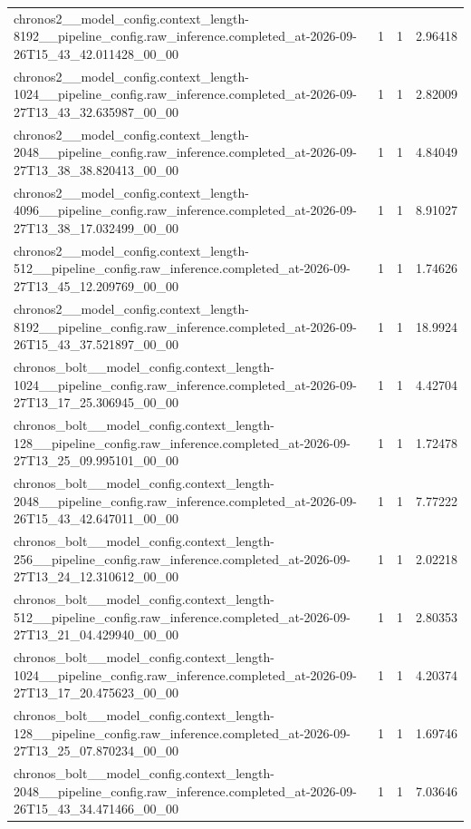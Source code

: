 \begin{tabular}{llll}
chronos2\_\_model\_config.context\_length-8192\_\_pipeline\_config.raw\_inference.completed\_at-2026-09-26T15\_43\_42.011428\_00\_00 & 1 & 1 & 2.96418 \\
chronos2\_\_model\_config.context\_length-1024\_\_pipeline\_config.raw\_inference.completed\_at-2026-09-27T13\_43\_32.635987\_00\_00 & 1 & 1 & 2.82009 \\
chronos2\_\_model\_config.context\_length-2048\_\_pipeline\_config.raw\_inference.completed\_at-2026-09-27T13\_38\_38.820413\_00\_00 & 1 & 1 & 4.84049 \\
chronos2\_\_model\_config.context\_length-4096\_\_pipeline\_config.raw\_inference.completed\_at-2026-09-27T13\_38\_17.032499\_00\_00 & 1 & 1 & 8.91027 \\
chronos2\_\_model\_config.context\_length-512\_\_pipeline\_config.raw\_inference.completed\_at-2026-09-27T13\_45\_12.209769\_00\_00 & 1 & 1 & 1.74626 \\
chronos2\_\_model\_config.context\_length-8192\_\_pipeline\_config.raw\_inference.completed\_at-2026-09-26T15\_43\_37.521897\_00\_00 & 1 & 1 & 18.9924 \\
chronos\_bolt\_\_model\_config.context\_length-1024\_\_pipeline\_config.raw\_inference.completed\_at-2026-09-27T13\_17\_25.306945\_00\_00 & 1 & 1 & 4.42704 \\
chronos\_bolt\_\_model\_config.context\_length-128\_\_pipeline\_config.raw\_inference.completed\_at-2026-09-27T13\_25\_09.995101\_00\_00 & 1 & 1 & 1.72478 \\
chronos\_bolt\_\_model\_config.context\_length-2048\_\_pipeline\_config.raw\_inference.completed\_at-2026-09-26T15\_43\_42.647011\_00\_00 & 1 & 1 & 7.77222 \\
chronos\_bolt\_\_model\_config.context\_length-256\_\_pipeline\_config.raw\_inference.completed\_at-2026-09-27T13\_24\_12.310612\_00\_00 & 1 & 1 & 2.02218 \\
chronos\_bolt\_\_model\_config.context\_length-512\_\_pipeline\_config.raw\_inference.completed\_at-2026-09-27T13\_21\_04.429940\_00\_00 & 1 & 1 & 2.80353 \\
chronos\_bolt\_\_model\_config.context\_length-1024\_\_pipeline\_config.raw\_inference.completed\_at-2026-09-27T13\_17\_20.475623\_00\_00 & 1 & 1 & 4.20374 \\
chronos\_bolt\_\_model\_config.context\_length-128\_\_pipeline\_config.raw\_inference.completed\_at-2026-09-27T13\_25\_07.870234\_00\_00 & 1 & 1 & 1.69746 \\
chronos\_bolt\_\_model\_config.context\_length-2048\_\_pipeline\_config.raw\_inference.completed\_at-2026-09-26T15\_43\_34.471466\_00\_00 & 1 & 1 & 7.03646 \\

\end{tabular}
